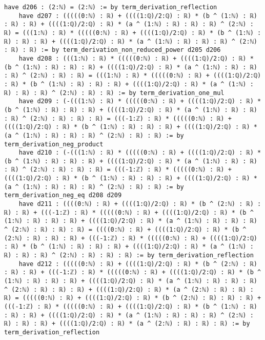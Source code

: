 \documentclass{article}
\begin{document}
\begin{tcolorbox}[colback=white!10, width=\linewidth]
\begin{lstlisting}[language=Lean4]
    have d206 : (2:ℕ) = (2:ℕ) := by term_derivation_reflection
    have d207 : (((((0:ℕ) : ℝ) + ((((1:ℚ)/2:ℚ) : ℝ) * (b ^ (1:ℕ) : ℝ) : ℝ) : ℝ) + ((((1:ℚ)/2:ℚ) : ℝ) * (a ^ (1:ℕ) : ℝ) : ℝ) : ℝ) ^ (2:ℕ) : ℝ) = (((1:ℕ) : ℝ) * (((((0:ℕ) : ℝ) + ((((1:ℚ)/2:ℚ) : ℝ) * (b ^ (1:ℕ) : ℝ) : ℝ) : ℝ) + ((((1:ℚ)/2:ℚ) : ℝ) * (a ^ (1:ℕ) : ℝ) : ℝ) : ℝ) ^ (2:ℕ) : ℝ) : ℝ) := by term_derivation_non_reduced_power d205 d206
    have d208 : (((1:ℕ) : ℝ) * (((((0:ℕ) : ℝ) + ((((1:ℚ)/2:ℚ) : ℝ) * (b ^ (1:ℕ) : ℝ) : ℝ) : ℝ) + ((((1:ℚ)/2:ℚ) : ℝ) * (a ^ (1:ℕ) : ℝ) : ℝ) : ℝ) ^ (2:ℕ) : ℝ) : ℝ) = (((1:ℕ) : ℝ) * (((((0:ℕ) : ℝ) + ((((1:ℚ)/2:ℚ) : ℝ) * (b ^ (1:ℕ) : ℝ) : ℝ) : ℝ) + ((((1:ℚ)/2:ℚ) : ℝ) * (a ^ (1:ℕ) : ℝ) : ℝ) : ℝ) ^ (2:ℕ) : ℝ) : ℝ) := by term_derivation_one_mul
    have d209 : (-(((1:ℕ) : ℝ) * (((((0:ℕ) : ℝ) + ((((1:ℚ)/2:ℚ) : ℝ) * (b ^ (1:ℕ) : ℝ) : ℝ) : ℝ) + ((((1:ℚ)/2:ℚ) : ℝ) * (a ^ (1:ℕ) : ℝ) : ℝ) : ℝ) ^ (2:ℕ) : ℝ) : ℝ) : ℝ) = (((-1:ℤ) : ℝ) * (((((0:ℕ) : ℝ) + ((((1:ℚ)/2:ℚ) : ℝ) * (b ^ (1:ℕ) : ℝ) : ℝ) : ℝ) + ((((1:ℚ)/2:ℚ) : ℝ) * (a ^ (1:ℕ) : ℝ) : ℝ) : ℝ) ^ (2:ℕ) : ℝ) : ℝ) := by term_derivation_neg_product
    have d210 : (-(((1:ℕ) : ℝ) * (((((0:ℕ) : ℝ) + ((((1:ℚ)/2:ℚ) : ℝ) * (b ^ (1:ℕ) : ℝ) : ℝ) : ℝ) + ((((1:ℚ)/2:ℚ) : ℝ) * (a ^ (1:ℕ) : ℝ) : ℝ) : ℝ) ^ (2:ℕ) : ℝ) : ℝ) : ℝ) = (((-1:ℤ) : ℝ) * (((((0:ℕ) : ℝ) + ((((1:ℚ)/2:ℚ) : ℝ) * (b ^ (1:ℕ) : ℝ) : ℝ) : ℝ) + ((((1:ℚ)/2:ℚ) : ℝ) * (a ^ (1:ℕ) : ℝ) : ℝ) : ℝ) ^ (2:ℕ) : ℝ) : ℝ) := by term_derivation_neg_eq d208 d209
    have d211 : ((((0:ℕ) : ℝ) + ((((1:ℚ)/2:ℚ) : ℝ) * (b ^ (2:ℕ) : ℝ) : ℝ) : ℝ) + (((-1:ℤ) : ℝ) * (((((0:ℕ) : ℝ) + ((((1:ℚ)/2:ℚ) : ℝ) * (b ^ (1:ℕ) : ℝ) : ℝ) : ℝ) + ((((1:ℚ)/2:ℚ) : ℝ) * (a ^ (1:ℕ) : ℝ) : ℝ) : ℝ) ^ (2:ℕ) : ℝ) : ℝ) : ℝ) = ((((0:ℕ) : ℝ) + ((((1:ℚ)/2:ℚ) : ℝ) * (b ^ (2:ℕ) : ℝ) : ℝ) : ℝ) + (((-1:ℤ) : ℝ) * (((((0:ℕ) : ℝ) + ((((1:ℚ)/2:ℚ) : ℝ) * (b ^ (1:ℕ) : ℝ) : ℝ) : ℝ) + ((((1:ℚ)/2:ℚ) : ℝ) * (a ^ (1:ℕ) : ℝ) : ℝ) : ℝ) ^ (2:ℕ) : ℝ) : ℝ) : ℝ) := by term_derivation_reflection
    have d212 : (((((0:ℕ) : ℝ) + ((((1:ℚ)/2:ℚ) : ℝ) * (b ^ (2:ℕ) : ℝ) : ℝ) : ℝ) + (((-1:ℤ) : ℝ) * (((((0:ℕ) : ℝ) + ((((1:ℚ)/2:ℚ) : ℝ) * (b ^ (1:ℕ) : ℝ) : ℝ) : ℝ) + ((((1:ℚ)/2:ℚ) : ℝ) * (a ^ (1:ℕ) : ℝ) : ℝ) : ℝ) ^ (2:ℕ) : ℝ) : ℝ) : ℝ) + ((((1:ℚ)/2:ℚ) : ℝ) * (a ^ (2:ℕ) : ℝ) : ℝ) : ℝ) = (((((0:ℕ) : ℝ) + ((((1:ℚ)/2:ℚ) : ℝ) * (b ^ (2:ℕ) : ℝ) : ℝ) : ℝ) + (((-1:ℤ) : ℝ) * (((((0:ℕ) : ℝ) + ((((1:ℚ)/2:ℚ) : ℝ) * (b ^ (1:ℕ) : ℝ) : ℝ) : ℝ) + ((((1:ℚ)/2:ℚ) : ℝ) * (a ^ (1:ℕ) : ℝ) : ℝ) : ℝ) ^ (2:ℕ) : ℝ) : ℝ) : ℝ) + ((((1:ℚ)/2:ℚ) : ℝ) * (a ^ (2:ℕ) : ℝ) : ℝ) : ℝ) := by term_derivation_reflection

\end{lstlisting}
\end{tcolorbox}
\end{document}
